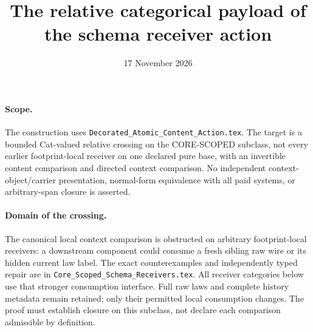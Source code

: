 \documentclass[11pt]{article}
\title{The relative categorical payload of the schema receiver action}
\date{17 November 2026}
\begin{document}
\maketitle
\paragraph{Scope.} The construction uses \texttt{Decorated\_Atomic\_Content\_Action.tex}. The target is a bounded Cat-valued relative crossing on the CORE-SCOPED subclass, not every earlier footprint-local receiver on one declared pure base, with an invertible content comparison and directed context comparison. No independent context-object/carrier presentation, normal-form equivalence with all paid systems, or arbitrary-span closure is asserted.

\paragraph{Domain of the crossing.}
The canonical local context comparison is obstructed on arbitrary footprint-local receivers: a downstream component could consume a fresh sibling raw wire or its hidden current law label. The exact counterexamples and independently typed repair are in \texttt{Core\_Scoped\_Schema\_Receivers.tex}. All receiver categories below use that stronger consumption interface. Full raw laws and complete history metadata remain retained; only their permitted local consumption changes. The proof must establish closure on this subclass, not declare each comparison admissible by definition.
\end{document}
